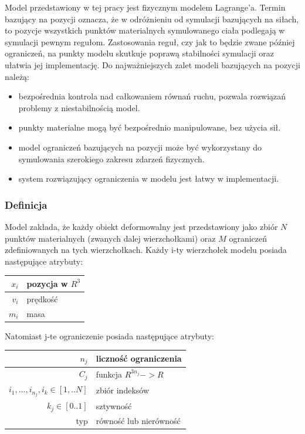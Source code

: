 Model przedstawiony w tej pracy jest fizycznym modelem Lagrange'a. Termin
bazujący na pozycji oznacza, że w odróżnieniu od symulacji bazujących na siłach, to pozycje
wszystkich punktów materialnych symulowanego ciała podlegają w symulacji pewnym
regułom. Zastosowania reguł, czy jak to będzie zwane później ograniczeń, na
punkty modelu skutkuje poprawą stabilności symulacji oraz ułatwia jej
implementację. Do najważniejszych zalet modeli bazujących na pozycji należą:
\begin{itemize}
	\item bezpośrednia kontrola nad całkowaniem równań ruchu, pozwala rozwiązań
	problemy z niestabilnością model.
	\item punkty materialne mogą być bezpośrednio manipulowane, bez użycia sił.
	\item model ograniczeń bazujących na pozycji może być wykorzystany do
	symulowania szerokiego zakresu zdarzeń fizycznych.
	\item system rozwiązujący ograniczenia w modelu jest łatwy w implementacji.
\end{itemize}

\subsubsection{Definicja}
Model zakłada, że każdy obiekt deformowalny jest przedstawiony jako zbiór $N$
punktów materialnych (zwanych dalej wierzchołkami) oraz $M$ ograniczeń
zdefiniowanych na tych wierzchołkach. Każdy i-ty wierzchołek modelu posiada
następujące atrybuty:

\centering
\begin{tabular}{|r|l|}
\hline
$x_i$ & pozycja w $R^3$ \\
\hline
$v_i$ & prędkość \\
\hline
$m_i$ & masa\\
\hline
\end{tabular}

\raggedright
Natomiast j-te ograniczenie posiada następujące atrybuty:

\centering
\begin{tabular}{|r|l|}
\hline
$n_j$ & liczność ograniczenia \\
\hline
$C_j$ & funkcja $R^{3n_j} -> R$\\
\hline
${i_1, ..., i_{n_j}}, i_k \in [1,..N]$ & zbiór indeksów\\
\hline
$k_j \in [0.. 1]$ & sztywność\\
\hline
typ & równość lub nierówność\\
\hline
\end{tabular}

